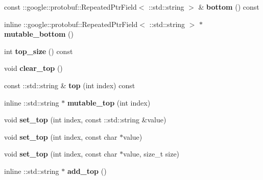 \begin{DoxyCompactItemize}
const \+::google\+::protobuf\+::\+Repeated\+Ptr\+Field$<$ \+::std\+::string $>$ \& {\bfseries bottom} () const
\item 
\mbox{\label{classcaffe_1_1_layer_parameter_af673e281989fe9abf56a48ed879f1e86}} 
inline \+::google\+::protobuf\+::\+Repeated\+Ptr\+Field$<$ \+::std\+::string $>$ $\ast$ {\bfseries mutable\+\_\+bottom} ()
\item 
\mbox{\label{classcaffe_1_1_layer_parameter_a8c62d08a0e5cfb7f2505379852eb3e1a}} 
int {\bfseries top\+\_\+size} () const
\item 
\mbox{\label{classcaffe_1_1_layer_parameter_a635d2f5c7625cf48fb65f7d6880c30c6}} 
void {\bfseries clear\+\_\+top} ()
\item 
\mbox{\label{classcaffe_1_1_layer_parameter_a8c99e8f2106be37e4c17ba773f0e633e}} 
const \+::std\+::string \& {\bfseries top} (int index) const
\item 
\mbox{\label{classcaffe_1_1_layer_parameter_abe10cc8238d58622bdf00071f2f42fa7}} 
inline \+::std\+::string $\ast$ {\bfseries mutable\+\_\+top} (int index)
\item 
\mbox{\label{classcaffe_1_1_layer_parameter_a3befd1b1f1554414f3b1fd1156f8f6af}} 
void {\bfseries set\+\_\+top} (int index, const \+::std\+::string \&value)
\item 
\mbox{\label{classcaffe_1_1_layer_parameter_acf9aafbc2692314c1903e7ad28a66c81}} 
void {\bfseries set\+\_\+top} (int index, const char $\ast$value)
\item 
\mbox{\label{classcaffe_1_1_layer_parameter_a8f61b9f9fa3b59373578eb21d88af698}} 
void {\bfseries set\+\_\+top} (int index, const char $\ast$value, size\+\_\+t size)
\item 
\mbox{\label{classcaffe_1_1_layer_parameter_ac849f73cf676aa9f40e3b636651d78fe}} 
inline \+::std\+::string $\ast$ {\bfseries add\+\_\+top} ()
\item 

\end{DoxyCompactItemize}
